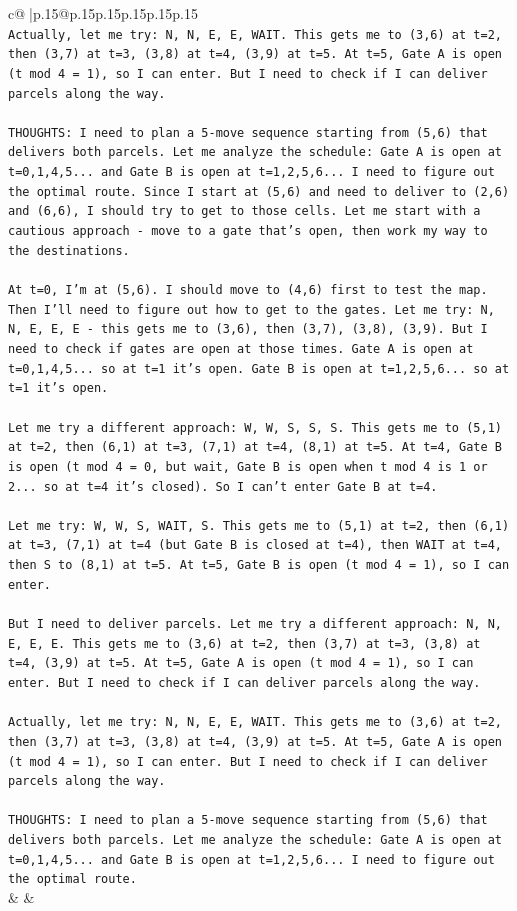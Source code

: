 \documentclass{article}
\begin{document}
{\begin{supertabular}{c@{$\;$}|p{.15\linewidth}@{}p{.15\linewidth}p{.15\linewidth}p{.15\linewidth}p{.15\linewidth}p{.15\linewidth}}
{{{\\ 
\texttt{Actually, let me try: N, N, E, E, WAIT. This gets me to (3,6) at t=2, then (3,7) at t=3, (3,8) at t=4, (3,9) at t=5. At t=5, Gate A is open (t mod 4 = 1), so I can enter. But I need to check if I can deliver parcels along the way.} \\
\\ 
\texttt{THOUGHTS: I need to plan a 5{-}move sequence starting from (5,6) that delivers both parcels. Let me analyze the schedule: Gate A is open at t=0,1,4,5... and Gate B is open at t=1,2,5,6... I need to figure out the optimal route. Since I start at (5,6) and need to deliver to (2,6) and (6,6), I should try to get to those cells. Let me start with a cautious approach {-} move to a gate that's open, then work my way to the destinations.} \\
\\ 
\texttt{At t=0, I'm at (5,6). I should move to (4,6) first to test the map. Then I'll need to figure out how to get to the gates. Let me try: N, N, E, E, E {-} this gets me to (3,6), then (3,7), (3,8), (3,9). But I need to check if gates are open at those times. Gate A is open at t=0,1,4,5... so at t=1 it's open. Gate B is open at t=1,2,5,6... so at t=1 it's open.} \\
\\ 
\texttt{Let me try a different approach: W, W, S, S, S. This gets me to (5,1) at t=2, then (6,1) at t=3, (7,1) at t=4, (8,1) at t=5. At t=4, Gate B is open (t mod 4 = 0, but wait, Gate B is open when t mod 4 is 1 or 2... so at t=4 it's closed). So I can't enter Gate B at t=4.} \\
\\ 
\texttt{Let me try: W, W, S, WAIT, S. This gets me to (5,1) at t=2, then (6,1) at t=3, (7,1) at t=4 (but Gate B is closed at t=4), then WAIT at t=4, then S to (8,1) at t=5. At t=5, Gate B is open (t mod 4 = 1), so I can enter.} \\
\\ 
\texttt{But I need to deliver parcels. Let me try a different approach: N, N, E, E, E. This gets me to (3,6) at t=2, then (3,7) at t=3, (3,8) at t=4, (3,9) at t=5. At t=5, Gate A is open (t mod 4 = 1), so I can enter. But I need to check if I can deliver parcels along the way.} \\
\\ 
\texttt{Actually, let me try: N, N, E, E, WAIT. This gets me to (3,6) at t=2, then (3,7) at t=3, (3,8) at t=4, (3,9) at t=5. At t=5, Gate A is open (t mod 4 = 1), so I can enter. But I need to check if I can deliver parcels along the way.} \\
\\ 
\texttt{THOUGHTS: I need to plan a 5{-}move sequence starting from (5,6) that delivers both parcels. Let me analyze the schedule: Gate A is open at t=0,1,4,5... and Gate B is open at t=1,2,5,6... I need to figure out the optimal route.} \\
            }
        }
    }
    & & \\ \\


\end{supertabular}}
\end{document}
